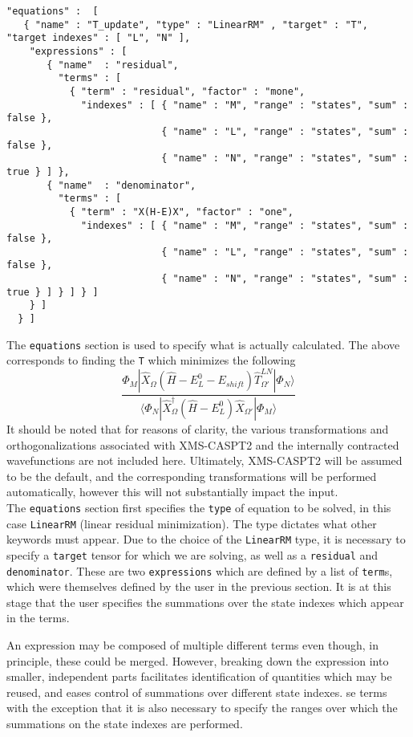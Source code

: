 \begin{lstlisting}[label={lst:equations}]
"equations" :  [
   { "name" : "T_update", "type" : "LinearRM" , "target" : "T", "target indexes" : [ "L", "N" ],
    "expressions" : [
       { "name"  : "residual",
         "terms" : [
           { "term" : "residual", "factor" : "mone",
             "indexes" : [ { "name" : "M", "range" : "states", "sum" : false },
                           { "name" : "L", "range" : "states", "sum" : false },
                           { "name" : "N", "range" : "states", "sum" : true } ] },
       { "name"  : "denominator",
         "terms" : [
           { "term" : "X(H-E)X", "factor" : "one",                                                 
             "indexes" : [ { "name" : "M", "range" : "states", "sum" : false },
                           { "name" : "L", "range" : "states", "sum" : false },
                           { "name" : "N", "range" : "states", "sum" : true } ] } ] } ]
    } ]
  } ]
\end{lstlisting}         
The \texttt{equations} section is used to specify what is actually calculated. The above corresponds to
finding the \texttt{T} which minimizes the following
\begin{equation}
\frac{ \Phi_{M} |  \hat{X}_{\Omega} ( \hat{H}-E^{0}_{L}-E_{shift} )  \hat{T}^{LN}_{\Omega'} | \Phi_{N} \rangle } 
{ \langle \Phi_{N}   | \hat{X}^{\dagger}_{\Omega}
                     ( \hat{H}- E^{0}_{L} )
                       \hat{X}_{\Omega'} |
 \Phi_{M} \rangle}
\end{equation}
It should be noted that for reasons of clarity, the various transformations and orthogonalizations associated
with XMS-CASPT2 and the internally contracted wavefunctions are not included here. Ultimately, XMS-CASPT2
will be assumed to be the default, and the corresponding transformations will be performed automatically, however
this will not substantially impact the input. \\

\noindent The  \texttt{equations} section first specifies the \texttt{type} of equation to be solved, in
this case \texttt{LinearRM} (linear residual minimization). The type dictates what other keywords must appear.
Due to the choice of the \texttt{LinearRM} type, it is necessary to specify a \texttt{target} tensor for 
which we are solving, as well as a \texttt{residual} and \texttt{denominator}. These are two \texttt{expressions}
which are defined by a list of \texttt{term}s, which were themselves defined by the user in the previous section. 
It is at this stage that the user specifies the summations over the state indexes which appear in the terms.

\noindent An expression may be composed of multiple different terms even though, in principle, these could be merged.
However, breaking down the expression into smaller, independent parts facilitates identification of
quantities which may be reused, and eases control of summations over different state indexes. 
se terms with the exception that it is also necessary to specify the ranges over
which the summations on the state indexes are performed.
